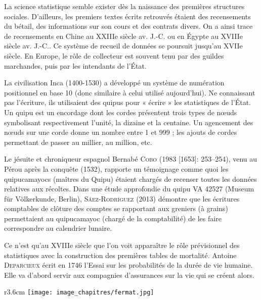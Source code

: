 
\begin{His}

La science statistique semble exister dès la naissance des premières structures sociales. D'ailleurs, les premiers textes écrits retrouvés étaient des recensements du bétail, des informations sur son cours et des contrats divers. On a ainsi trace de recensements en Chine au XXIIIe siècle av. J.-C. ou en Égypte au XVIIIe siècle av. J.-C.. Ce système de recueil de données se poursuit jusqu'au XVIIe siècle. En Europe, le rôle de collecteur est souvent tenu par des guildes marchandes, puis par les intendants de l'État.

\vspace{0.4cm}

La civilisation Inca (1400-1530) a développé un système de numération positionnel en base 10 (donc similaire à celui utilisé aujourd'hui). Ne connaissant pas l'écriture, ils utilisaient des quipus pour « écrire » les statistiques de l'État. Un quipu est un encordage dont les cordes présentent trois types de nœuds symbolisant respectivement l'unité, la dizaine et la centaine. Un agencement des nœuds sur une corde donne un nombre entre 1 et 999 ; les ajouts de cordes permettant de passer au millier, au million, etc.

Le jésuite et chroniqueur espagnol Bernabé \textsc{Cobo} (1983 [1653]: 253–254), venu au Pérou après la conquête (1532), rapporte un témoignage comme quoi les quipucamayocs (maîtres du Quipu) étaient chargés de recenser toutes les données relatives aux récoltes. Dans une étude approfondie du quipu VA 42527 (Museum für Völkerkunde, Berlin), \textsc{Sáez-Rodríguez} (2013) démontre que les écritures comptables de clôture des comptes se rapportant aux greniers (à grains) permettaient au quipucamayoc (chargé de la comptabilité) de les faire correspondre au calendrier lunaire.

\vspace{0.4cm}
Ce n'est qu'au XVIIIe siècle que l'on voit apparaître le rôle prévisionnel des statistiques avec la construction des premières tables de mortalité. Antoine \textsc{Deparcieux} écrit en 1746 l'Essai sur les probabilités de la durée de vie humaine. Elle va d'abord servir aux compagnies d'assurances sur la vie qui se créent alors.

\vspace{0.4cm}

\begin{wrapfigure}[15]{r}{3.6cm}
\vspace{-7mm}
\texttt{[image: image\_chapitres/fermat.jpg]}


\end{wrapfigure}
\end{His}
